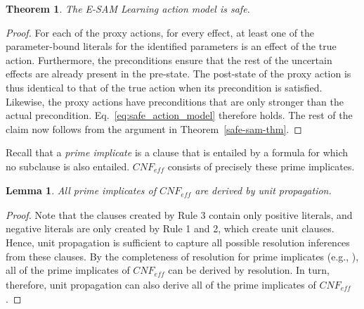 \documentclass{article}
\newtheorem{theorem}{Theorem}
\newtheorem{lemma}{Lemma}
\newcommand{\eff}{\textit{eff}}
\newcommand{\cnf}{\textit{CNF}}
\begin{document}
\begin{theorem}\label{extended-sam-safe}
The E-SAM Learning action model is safe.
\end{theorem}
\begin{proof}
For each of the proxy actions, for every effect, at least one of the parameter-bound literals for the identified parameters is an effect of the true action. Furthermore,  the preconditions ensure that the rest of the uncertain effects are already present in the pre-state. The post-state of the proxy action is thus identical to that of the true action when its precondition is satisfied. Likewise, the proxy actions have preconditions that are only stronger than the actual precondition. Eq.~\ref{eq:safe_action_model} therefore holds. The rest of the claim now follows from the argument in Theorem~\ref{safe-sam-thm}.
\end{proof}

Recall that a \emph{prime implicate} is a clause that is entailed by a formula for which no subclause is also entailed. %
$\cnf_\eff$ consists of precisely these prime implicates.
\begin{lemma}\label{unit-prop-complete-lem}
All prime implicates of $\cnf_\eff$ %
are derived by unit propagation.
\end{lemma}
\begin{proof}
Note that the clauses created by Rule 3 contain only positive literals, and negative literals are only created by Rule 1 and 2, which create unit clauses. Hence, unit propagation is sufficient to capture all possible resolution inferences from these clauses. 
By the completeness of resolution for prime implicates (e.g., \cite[Ch.\ 13, Exercise 1]{brachman2004}),
all of the prime implicates of $\cnf_\eff$ %
can be derived by resolution. In turn, therefore, unit propagation can also derive all of the prime implicates of $\cnf_\eff$.
\end{proof}
\end{document}
